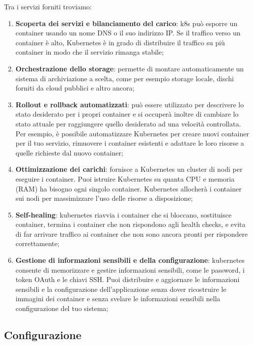 \documentclass{article}
\begin{document}
Tra i servizi forniti troviamo:

\begin{enumerate} 
    \item \textbf{Scoperta dei servizi e bilanciamento del carico}: k8s può esporre un container usando un nome DNS o il suo indirizzo IP. Se il traffico verso un container è alto, Kubernetes è in grado di distribuire il traffico su più container in modo che il servizio rimanga stabile;
    \item \textbf{Orchestrazione dello storage}: permette di montare automaticamente un sistema di archiviazione a scelta, come per esempio storage locale, dischi forniti da cloud pubblici e altro ancora;
    \item \textbf{Rollout e rollback automatizzati}: può essere utilizzato per descrivere lo stato desiderato per i propri container e si occuperà inoltre di cambiare lo stato attuale per raggiungere quello desiderato ad una velocità controllata. Per esempio, è possibile automatizzare Kubernetes per creare nuovi container per il tuo servizio, rimuovere i container esistenti e adattare le loro risorse a quelle richieste dal nuovo container;
    \item \textbf{Ottimizzazione dei carichi}: fornisce a Kubernetes un cluster di nodi per eseguire i container. Puoi istruire Kubernetes su quanta CPU e memoria (RAM) ha bisogno ogni singolo container. Kubernetes allocherà i container sui nodi per massimizzare l'uso delle risorse a disposizione;
    \item \textbf{Self-healing}: kubernetes riavvia i container che si bloccano, sostituisce container, termina i container che non rispondono agli health checks, e evita di far arrivare traffico ai container che non sono ancora pronti per rispondere correttamente;
    \item \textbf{Gestione di informazioni sensibili e della configurazione}: kubernetes consente di memorizzare e gestire informazioni sensibili, come le password, i token OAuth e le chiavi SSH. Puoi distribuire e aggiornare le informazioni sensibili e la configurazione dell'applicazione senza dover ricostruire le immagini dei container e senza svelare le informazioni sensibili nella configurazione del tuo sistema;
\end{enumerate}

\subsection{Configurazione}
\end{document}
